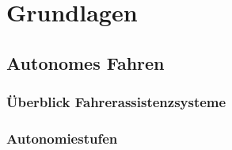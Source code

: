 \chapter{Grundlagen} \label{cha:grundlagen}

\lipsum[1]

\section{Autonomes Fahren} \label{sec:AutonomesFahren}
\subsection{Überblick Fahrerassistenzsysteme} \label{subsec:FAS}
\lipsum[1-1]
\subsection{Autonomiestufen} \label{Autonomiestufen}%
\lipsum[1-1]


